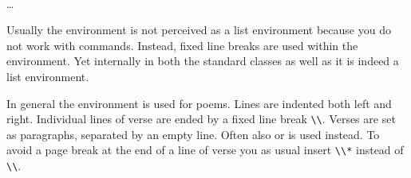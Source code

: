 \ifCommonscrextend\else
\begin{Declaration}
  \\
  \quad\dots\\
\end{Declaration}%
%
Usually the  environment is not perceived as a list
environment because you do not work with 
commands. Instead, fixed line breaks are used within the
 environment. Yet internally in both the
standard classes as well as {\KOMAScript} it is indeed a list
environment.

In general the  environment is used for
poems.  Lines are indented both left and
right. Individual lines of verse are ended by a fixed line break
\verb|\\|. Verses are set as paragraphs, separated by an empty
line. Often also  or
 is used instead. To avoid a page
break at the end of a line of verse you as usual insert \verb|\\*|
instead of \verb|\\|.
\ifCommonmaincls
